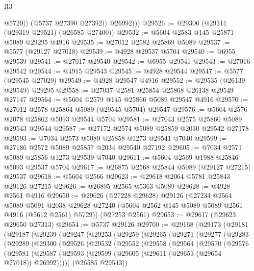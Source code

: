 \begin{lexlean}{R3}
\begin{coremodule}
                @5729))
            (@5737 @27390 @27392))
          @26992)))
@29526 := @29306 (@29311 (@29319 @29521) (@26585 @27400))
@29532 := @5604 @2583 @145 @25871 @5089 @29295 @4916
@29535 := @27012 @2582 @25869 @5089
@29537 := @5577 (@29127 @27018)
@29539 := @4928 @29537 @5704
@29540 := @6955 @29539
@29541 := @27017 @29540
@29542 := @6955 @29541
@29543 := @27016 @29542
@29544 := @4915 @29543
@29545 := @4928 @29544
@29547 := @5577 (@29545 @27029)
@29549 := @4928 @29547 @4916
@29552 := @29535 (@26139 @29549) @29295
@29558 := @27037 @2581 @25854 @25868 @26138 @29549 @27147
@29564 := @5604 @2579 @145 @25866 @5089 @29547 @4916
@29570 := @27012 @2578 @25864 @5089 (@29545 @5704) @29547
@29576 := @5604 @2576 @2078 @25862 @5093 @29544 @5704
@29581 := @27043 @2575 @25860 @5089 @29543 @29544
@29587 := @27172 @2574 @5089 @25859 @2030 @29542 @27178
@29593 := @7034 @2573 @5089 @25858 @1273 @29541 @7040
@29599 := @27186 @2572 @5089 @25857 @2034 @29540 @27192
@29605 := @7034 @2571 @5089 @25856 @1273 @29539 @7040
@29611 := @5604 @2569 @1988 @25846 @5093 @29537 @5704
@29617 := @26875 @2568 @25844 @5089 (@29127 @27215) @29537
@29618 := @5604 @2566
@29623 := @29618 @2064 @5781 @25843 @29126 @27215
@29626 := @26895 @2565 @5363 @5089
@29628 := @4928 @2561 @4916
@29650 := @29626
    (@27228 @29628)
    @29126
    (@27234
      @2564
      @5089
      @5091
      @2038
      @29628
      @27240
      (@5604 @2562 @145 @5089 @5089 @2561 @4916 (@5612 @2561) @5729))
    (@27253 @2561)
@29653 := @29617 (@29623 @29650 @27313)
@29654 := @5737 @29126
@29700 := @29168
    (@29173
      (@29181
        (@29187
          (@29239
            (@29247
              (@29253
                (@29259
                  (@29265
                    (@29271
                      (@29277
                        (@29283
                          (@29289
                            (@29300
                              (@29526
                                (@29532
                                  (@29552
                                    (@29558
                                      (@29564
                                        (@29570
                                          (@29576
                                            (@29581
                                              (@29587
                                                (@29593
                                                  (@29599
                                                    (@29605
                                                      (@29611 (@29653 (@29654 @27018)) @26992)))))
                                              (@26585 @29543))

\end{coremodule}
\end{lexlean}
